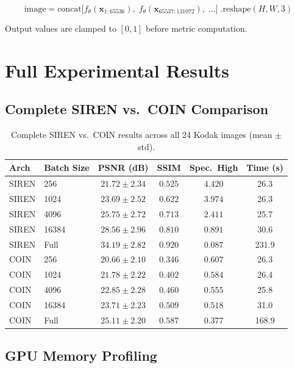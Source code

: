 \documentclass[a4paper,oneside,11pt,english]{scrartcl}
\begin{document}
\begin{equation}
    \text{image} = \text{concat}\bigl[f_\theta(\mathbf{x}_{1:65536}),\;
    f_\theta(\mathbf{x}_{65537:131072}),\; \ldots\bigr]
    \;\text{.reshape}(H, W, 3)
\end{equation}

Output values are clamped to $[0, 1]$ before metric computation.


\section{Full Experimental Results}
\label{app:full_results}

\subsection{Complete SIREN vs.\ COIN Comparison}

\begin{table}[H]
\centering
\caption{Complete SIREN vs.\ COIN results across all 24 Kodak images
(mean $\pm$ std).}
\label{tab:full_arch}
\begin{tabular}{llcccc}
\toprule
Arch & Batch Size & PSNR (dB) & SSIM & Spec.\ High & Time (s) \\
\midrule
SIREN & 256    & $21.72 \pm 2.34$ & $0.525$ & $4.420$ & 26.3 \\
SIREN & 1024   & $23.69 \pm 2.52$ & $0.622$ & $3.974$ & 26.3 \\
SIREN & 4096   & $25.75 \pm 2.72$ & $0.713$ & $2.411$ & 25.7 \\
SIREN & 16384  & $28.56 \pm 2.96$ & $0.810$ & $0.891$ & 30.6 \\
SIREN & Full   & $34.19 \pm 2.82$ & $0.920$ & $0.087$ & 231.9 \\
\midrule
COIN  & 256    & $20.66 \pm 2.10$ & $0.346$ & $0.607$ & 26.3 \\
COIN  & 1024   & $21.78 \pm 2.22$ & $0.402$ & $0.584$ & 26.4 \\
COIN  & 4096   & $22.85 \pm 2.28$ & $0.460$ & $0.555$ & 25.8 \\
COIN  & 16384  & $23.71 \pm 2.23$ & $0.509$ & $0.518$ & 31.0 \\
COIN  & Full   & $25.11 \pm 2.20$ & $0.587$ & $0.377$ & 168.9 \\
\bottomrule
\end{tabular}
\end{table}

\subsection{GPU Memory Profiling}
\end{document}
